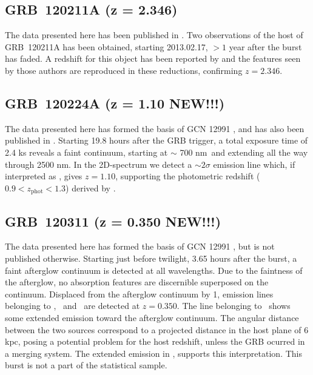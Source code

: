 \documentclass{aa}    %
\begin{document}
\subsection{GRB~120211A (z = 2.346)} \label{120211}

The data presented here has been published in \citet{Kruhler2015}. Two
observations of the host of GRB~120211A has been obtained, starting 2013.02.17,
$> 1$ year after the burst has faded. A redshift for this object has been
reported by \citet{Kruhler2015} and the features seen by those authors are
reproduced in these reductions, confirming $z =	2.346$.

\subsection{GRB~120224A (z = 1.10 NEW!!!)} \label{120224}

The data presented here has formed the basis of GCN 12991 \citep{GCN12991}, and
has also been published in \citet{Kruhler2015}. Starting 19.8 hours after the
GRB trigger, a total exposure time of 2.4 ks reveals a faint continuum, starting
at $\sim$ 700 nm~and extending all the way through 2500 nm. In the 2D-spectrum
we detect a $\sim 2 \sigma$ emission line which, if interpreted as \ha, gives $z
= 1.10$, supporting the photometric redshift ($0.9 < z_\mathrm{phot} < 1.3$)
derived by \citet{Kruhler2015}.

\subsection{GRB~120311 (z = 0.350 NEW!!!)} \label{120311}

The data presented here has formed the basis of GCN 12991 \citep{GCN12991}, but
is not published otherwise. Starting just before twilight, 3.65 hours after the
burst, a faint afterglow continuum is detected at all wavelengths. Due to the
faintness of the afterglow, no absorption features are discernible superposed on
the continuum. Displaced from the afterglow continuum by 1, emission lines
belonging to \hb, \oiii~and \ha~are detected at $z = 0.350$. The line belonging
to \ha~shows some extended emission toward the afterglow continuum. The angular
distance between the two sources correspond to a projected distance in the host
plane of 6 kpc, posing a potential problem for the host redshift, unless the GRB
ocurred in a merging system. The extended emission in \ha, supports this
interpretation. This burst is not a part of the statistical sample.
\end{document}

